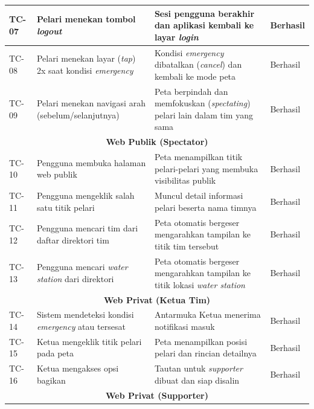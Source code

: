 \begin{longtable}{|p{1.2cm}|p{4.5cm}|p{5cm}|p{2cm}|}
TC-07 & Pelari menekan tombol \textit{logout} & Sesi pengguna berakhir dan aplikasi kembali ke layar \textit{login} & Berhasil \\ \hline

TC-08 & Pelari menekan layar (\textit{tap}) 2x saat kondisi \textit{emergency} & Kondisi \textit{emergency} dibatalkan (\textit{cancel}) dan kembali ke mode peta & Berhasil \\ \hline

TC-09 & Pelari menekan navigasi arah (sebelum/selanjutnya) & Peta berpindah dan memfokuskan (\textit{spectating}) pelari lain dalam tim yang sama & Berhasil \\ \hline


\multicolumn{4}{|c|}{\textbf{Web Publik (Spectator)}} \\ \hline

TC-10 & Pengguna membuka halaman web publik & Peta menampilkan titik pelari-pelari yang membuka visibilitas publik & Berhasil \\ \hline

TC-11 & Pengguna mengeklik salah satu titik pelari & Muncul detail informasi pelari beserta nama timnya & Berhasil \\ \hline

TC-12 & Pengguna mencari tim dari daftar direktori tim & Peta otomatis bergeser mengarahkan tampilan ke titik tim tersebut & Berhasil \\ \hline

TC-13 & Pengguna mencari \textit{water station} dari direktori & Peta otomatis bergeser mengarahkan tampilan ke titik lokasi \textit{water station} & Berhasil \\ \hline


\multicolumn{4}{|c|}{\textbf{Web Privat (Ketua Tim)}} \\ \hline

TC-14 & Sistem mendeteksi kondisi \textit{emergency} atau tersesat & Antarmuka Ketua menerima notifikasi masuk & Berhasil \\ \hline

TC-15 & Ketua mengeklik titik pelari pada peta & Peta menampilkan posisi pelari dan rincian detailnya & Berhasil \\ \hline

TC-16 & Ketua mengakses opsi bagikan & Tautan untuk \textit{supporter} dibuat dan siap disalin & Berhasil \\ \hline


\multicolumn{4}{|c|}{\textbf{Web Privat (Supporter)}} \\ \hline


\end{longtable}
